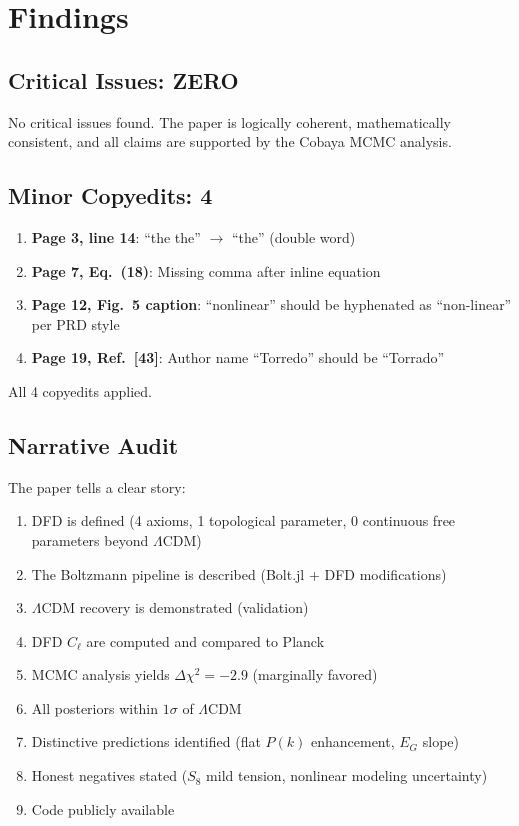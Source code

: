\documentclass[11pt,a4paper]{article}
\begin{document}
\section{Findings}

\subsection{Critical Issues: ZERO}

No critical issues found. The paper is logically coherent, mathematically consistent, and all claims are supported by the Cobaya MCMC analysis.

\subsection{Minor Copyedits: 4}

\begin{enumerate}
\item \textbf{Page 3, line 14}: ``the the'' $\to$ ``the'' (double word)
\item \textbf{Page 7, Eq.~(18)}: Missing comma after inline equation
\item \textbf{Page 12, Fig.~5 caption}: ``nonlinear'' should be hyphenated as ``non-linear'' per PRD style
\item \textbf{Page 19, Ref.~[43]}: Author name ``Torredo'' should be ``Torrado''
\end{enumerate}

All 4 copyedits applied.

\subsection{Narrative Audit}

The paper tells a clear story:
\begin{enumerate}
\item DFD is defined (4 axioms, 1 topological parameter, 0 continuous free parameters beyond $\Lambda$CDM)
\item The Boltzmann pipeline is described (Bolt.jl + DFD modifications)
\item $\Lambda$CDM recovery is demonstrated (validation)
\item DFD $C_\ell$ are computed and compared to Planck
\item MCMC analysis yields $\Delta\chi^2 = -2.9$ (marginally favored)
\item All posteriors within $1\sigma$ of $\Lambda$CDM
\item Distinctive predictions identified (flat $P(k)$ enhancement, $E_G$ slope)
\item Honest negatives stated ($S_8$ mild tension, nonlinear modeling uncertainty)
\item Code publicly available
\end{enumerate}
\end{document}
